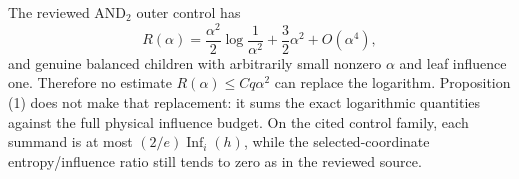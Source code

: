The reviewed AND$_2$ outer control has
\[
 R(\alpha)=\frac{\alpha^2}{2}\log\frac1{\alpha^2}
             +\frac32\alpha^2+O(\alpha^4),
\]
and genuine balanced children with arbitrarily small nonzero \(\alpha\)
and leaf influence one.  Therefore no estimate
\(R(\alpha)\le Cq\alpha^2\) can replace the logarithm.  Proposition (1)
does not make that replacement: it sums the exact logarithmic quantities
against the full physical influence budget.  On the cited control family,
each summand is at most \((2/e)\operatorname{Inf}_i(h)\), while the
selected-coordinate entropy/influence ratio still tends to zero as in the
reviewed source.

